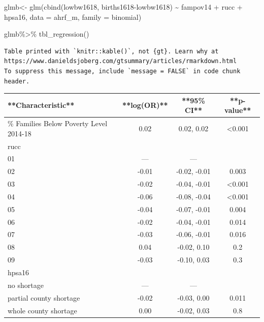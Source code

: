 \documentclass[
  letterpaper,
  DIV=11,
  numbers=noendperiod]{scrreprt}
\newenvironment{Shaded}{\begin{snugshade}}{\end{snugshade}}
\newcommand{\AttributeTok}[1]{\textcolor[rgb]{0.40,0.45,0.13}{#1}}
\newcommand{\FunctionTok}[1]{\textcolor[rgb]{0.28,0.35,0.67}{#1}}
\newcommand{\NormalTok}[1]{\textcolor[rgb]{0.00,0.23,0.31}{#1}}
\newcommand{\OtherTok}[1]{\textcolor[rgb]{0.00,0.23,0.31}{#1}}
\newcommand{\SpecialCharTok}[1]{\textcolor[rgb]{0.37,0.37,0.37}{#1}}
\begin{document}
\begin{Shaded}
\begin{Highlighting}[]
\NormalTok{glmb}\OtherTok{\textless{}{-}} \FunctionTok{glm}\NormalTok{(}\FunctionTok{cbind}\NormalTok{(lowbw1618, births1618}\SpecialCharTok{{-}}\NormalTok{lowbw1618) }\SpecialCharTok{\textasciitilde{}}\NormalTok{  fampov14 }\SpecialCharTok{+}\NormalTok{ rucc }\SpecialCharTok{+}\NormalTok{ hpsa16,}
          \AttributeTok{data =}\NormalTok{ ahrf\_m, }
          \AttributeTok{family =}\NormalTok{ binomial)}

\NormalTok{glmb}\SpecialCharTok{\%\textgreater{}\%}
  \FunctionTok{tbl\_regression}\NormalTok{()}
\end{Highlighting}
\end{Shaded}

\begin{verbatim}
Table printed with `knitr::kable()`, not {gt}. Learn why at
https://www.danieldsjoberg.com/gtsummary/articles/rmarkdown.html
To suppress this message, include `message = FALSE` in code chunk header.
\end{verbatim}

\begin{tabular}{l|c|c|c}
\hline
**Characteristic** & **log(OR)** & **95\% CI** & **p-value**\\
\hline
\% Families Below Poverty Level 2014-18 & 0.02 & 0.02, 0.02 & <0.001\\
\hline
rucc &  &  & \\
\hline
01 & — & — & \\
\hline
02 & -0.01 & -0.02, -0.01 & 0.003\\
\hline
03 & -0.02 & -0.04, -0.01 & <0.001\\
\hline
04 & -0.06 & -0.08, -0.04 & <0.001\\
\hline
05 & -0.04 & -0.07, -0.01 & 0.004\\
\hline
06 & -0.02 & -0.04, -0.01 & 0.014\\
\hline
07 & -0.03 & -0.06, -0.01 & 0.016\\
\hline
08 & 0.04 & -0.02, 0.10 & 0.2\\
\hline
09 & -0.03 & -0.10, 0.03 & 0.3\\
\hline
hpsa16 &  &  & \\
\hline
no shortage & — & — & \\
\hline
partial county shortage & -0.02 & -0.03, 0.00 & 0.011\\
\hline
whole county shortage & 0.00 & -0.02, 0.03 & 0.8\\
\hline
\end{tabular}
\end{document}
